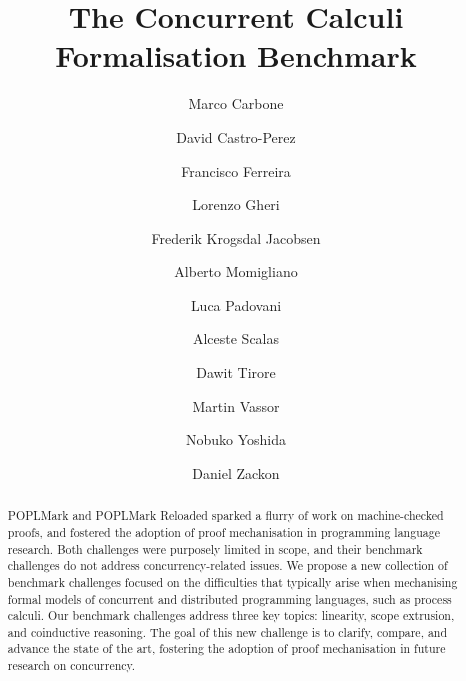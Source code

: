 \documentclass[runningheads]{llncs}
\begin{document}
\title{The Concurrent Calculi Formalisation Benchmark}

\author{
     Marco Carbone 
\and David Castro-Perez 
\and Francisco Ferreira 
\and Lorenzo Gheri 
\and Frederik Krogsdal Jacobsen 
\and Alberto Momigliano 
\and Luca Padovani 
\and Alceste Scalas 
\and Dawit Tirore 
\and Martin Vassor 
\and Nobuko Yoshida 
\and Daniel Zackon 
}



\maketitle

\begin{abstract}
  POPLMark and POPLMark Reloaded sparked a flurry of work on machine-checked proofs, and fostered the adoption of proof mechanisation in programming language research.
  Both challenges were purposely limited in scope, and their benchmark challenges do not address concurrency-related issues.
  We propose a new collection of benchmark challenges focused on the difficulties that typically arise when mechanising formal models of concurrent and distributed programming languages, such as process calculi.
  Our benchmark challenges address three key topics: linearity, scope extrusion, and coinductive reasoning.
  The goal of this new challenge is to clarify, compare, and advance the state of the art, fostering the adoption of proof mechanisation in future research on concurrency.

\end{abstract}
\end{document}

